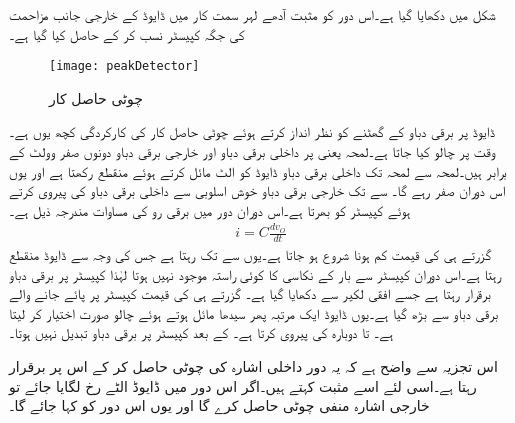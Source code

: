  
	شکل   میں  دکھایا گیا ہے۔اس دور کو مثبت آدھے لہر سمت کار میں ڈایوڈ   کے خارجی جانب مزاحمت کی جگہ کپیسٹر نسب کر کے حاصل کیا گیا ہے۔
\begin{figure}
\centering
\texttt{[image: peakDetector]}
\caption{چوٹی حاصل کار}
\label{شکل_چوٹی_حاصل_کار}
\end{figure}
ڈایوڈ پر برقی دباو کے  گھٹنے کو نظر انداز کرتے ہوئے چوٹی حاصل کار کی کارکردگی کچھ یوں ہے۔وقت  پر   چالو کیا جاتا ہے۔لمحہ یعنی  پر داخلی برقی دباو  اور خارجی برقی دباو  دونوں صفر وولٹ کے برابر ہیں۔لمحہ  سے لمحہ  تک داخلی برقی دباو ڈایوڈ کو الٹ مائل کرتے ہوئے منقطع رکھتا ہے اور یوں اس دوران  صفر رہے گا۔ سے  تک خارجی برقی دباو  خوش اسلوبی سے داخلی برقی دباو  کی پیروی کرتے ہوئے کپیسٹر کو بھرتا ہے۔اس دوران دور میں برقی رو کی مساوات مندرجہ ذیل ہے۔
\begin{align*}
i=C \frac{dv_O}{dt}
\end{align*}
 گزرتے ہی  کی قیمت کم ہونا شروع ہو جاتا ہے۔یوں  سے  تک  رہتا ہے جس کی وجہ سے ڈایوڈ منقطع رہتا ہے۔اس دوران کپیسٹر سے بار کے نکاسی کا کوئی راستہ موجود نہیں ہوتا لہٰذا کپیسٹر پر برقی دباو برقرار رہتا ہے جسے افقی لکیر سے دکھایا گیا ہے۔ گزرتے ہی  کی قیمت کپیسٹر پر پائے جانے والے برقی دباو سے بڑھ گیا ہے۔یوں ڈایوڈ ایک مرتبہ پھر سیدھا مائل ہوتے ہوئے چالو صورت اختیار کر لیتا ہے۔ تا   دوبارہ  کی پیروی کرتا ہے۔ کے بعد کپیسٹر پر برقی دباو تبدیل نہیں ہوتا۔

اس تجزیہ سے واضح ہے کہ یہ دور داخلی اشارہ کی چوٹی حاصل کر کے اس پر برقرار رہتا ہے۔اسی لئے اسے مثبت   کہتے ہیں۔اگر اس دور میں ڈایوڈ الٹے رخ لگایا جائے تو خارجی اشارہ  منفی چوٹی حاصل کرے  گا اور یوں اس دور کو  کہا جائے گا۔

